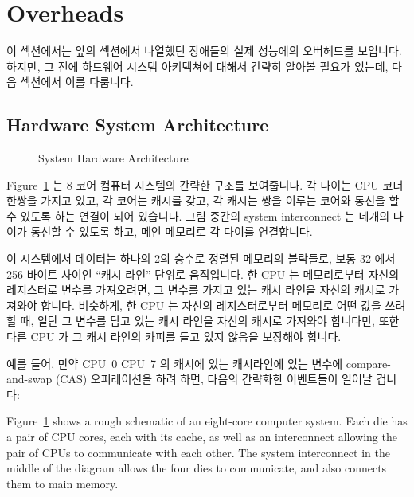 
\section{Overheads}
\label{sec:cpu:Overheads}

이 섹션에서는 앞의 섹션에서 나열했던 장애들의 실제 성능에의 오버헤드를
보입니다.
하지만, 그 전에 하드웨어 시스템 아키텍쳐에 대해서 간략히 알아볼 필요가 있는데,
다음 섹션에서 이를 다룹니다.

\subsection{Hardware System Architecture}
\label{sec:cpu:Hardware System Architecture}

\begin{figure}[tb]
\centering
{}
\caption{System Hardware Architecture}
\label{fig:cpu:System Hardware Architecture}
\end{figure}

Figure~\ref{fig:cpu:System Hardware Architecture} 는 8 코어 컴퓨터 시스템의
간략한 구조를 보여줍니다.
각 다이는 CPU 코더 한쌍을 가지고 있고, 각 코어는 캐시를 갖고, 각 캐시는 쌍을
이루는 코어와 통신을 할 수 있도록 하는 연결이 되어 있습니다.
그림 중간의 system interconnect 는 네개의 다이가 통신할 수 있도록 하고, 메인
메모리로 각 다이를 연결합니다.

이 시스템에서 데이터는 하나의 2의 승수로 정렬된 메모리의 블락들로, 보통 32 에서
256 바이트 사이인 ``캐시 라인'' 단위로 움직입니다.
한 CPU 는 메모리로부터 자신의 레지스터로 변수를 가져오려면, 그 변수를 가지고
있는 캐시 라인을 자신의 캐시로 가져와야 합니다.
비슷하게, 한 CPU 는 자신의 레지스터로부터 메모리로 어떤 값을 쓰려 할 때, 일단
그 변수를 담고 있는 캐시 라인을 자신의 캐시로 가져와야 합니다만, 또한 다른 CPU
가 그 캐시 라인의 카피를 들고 있지 않음을 보장해야 합니다.

예를 들어, 만약 CPU~0 CPU~7 의 캐시에 있는 캐시라인에 있는 변수에
compare-and-swap (CAS) 오퍼레이션을 하려 하면, 다음의 간략화한 이벤트들이
일어날 겁니다:

\iffalse
Figure~\ref{fig:cpu:System Hardware Architecture}
shows a rough schematic of an eight-core computer system.
Each die has a pair of CPU cores, each with its cache, as well as an
interconnect allowing the pair of CPUs to communicate with each other.
The system interconnect in the middle of the diagram allows the
four dies to communicate, and also connects them to main memory.

